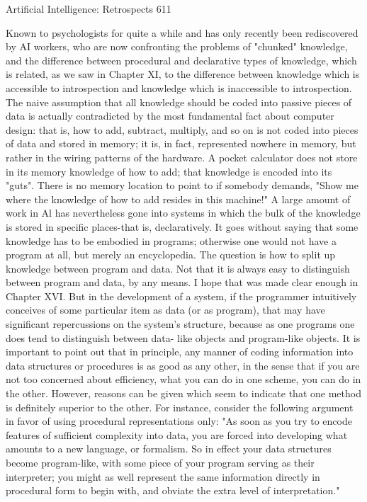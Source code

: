 {Artificial Intelligence: Retrospects                                                     611

Known to psychologists for quite a while and has only recently been rediscovered by AI
workers, who are now confronting the problems of "chunked" knowledge, and the
difference between procedural and declarative types of knowledge, which is related, as
we saw in Chapter XI, to the difference between knowledge which is accessible to
introspection and knowledge which is inaccessible to introspection.
        The naive assumption that all knowledge should be coded into passive pieces of
data is actually contradicted by the most fundamental fact about computer design: that is,
how to add, subtract, multiply, and so on is not coded into pieces of data and stored in
memory; it is, in fact, represented nowhere in memory, but rather in the wiring patterns of
the hardware. A pocket calculator does not store in its memory knowledge of how to add;
that knowledge is encoded into its "guts". There is no memory location to point to if
somebody demands, "Show me where the knowledge of how to add resides in this
machine!"
        A large amount of work in Al has nevertheless gone into systems in which the
bulk of the knowledge is stored in specific places-that is, declaratively. It goes without
saying that some knowledge has to be embodied in programs; otherwise one would not
have a program at all, but merely an encyclopedia. The question is how to split up
knowledge between program and data. Not that it is always easy to distinguish between
program and data, by any means. I hope that was made clear enough in Chapter XVI. But
in the development of a system, if the programmer intuitively conceives of some
particular item as data (or as program), that may have significant repercussions on the
system's structure, because as one programs one does tend to distinguish between data-
like objects and program-like objects.
        It is important to point out that in principle, any manner of coding information
into data structures or procedures is as good as any other, in the sense that if you are not
too concerned about efficiency, what you can do in one scheme, you can do in the other.
However, reasons can be given which seem to indicate that one method is definitely
superior to the other. For instance, consider the following argument in favor of using
procedural representations only: "As soon as you try to encode features of sufficient
complexity into data, you are forced into developing what amounts to a new language, or
formalism. So in effect your data structures become program-like, with some piece of
your program serving as their interpreter; you might as well represent the same
information directly in procedural form to begin with, and obviate the extra level of
interpretation."

}
